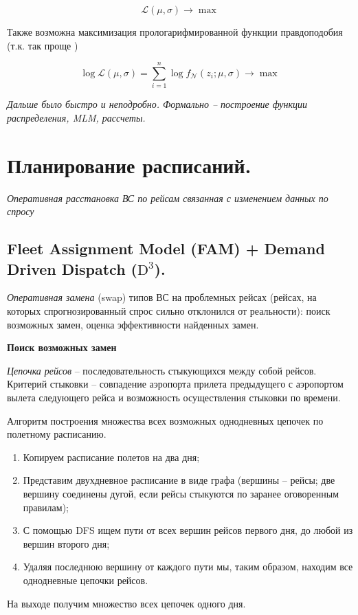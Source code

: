 \documentclass[12pt, reqno]{article}
\theoremstyle{definition}
\theoremstyle{definition}
\theoremstyle{definition}
\theoremstyle{definition}
\theoremstyle{definition}
\theoremstyle{definition}
\theoremstyle{definition}
\theoremstyle{definition}
\theoremstyle{definition}
\begin{document}
		$$\mathcal{L}(\mu, \sigma) \rightarrow \max$$
		
		Также возможна максимизация прологарифмированной функции правдоподобия (т.к. так проще )
		
		$$\log \mathcal{L}(\mu, \sigma) = \sum^n_{i = 1} \log f_\mathcal{N}(z_i; \mu, \sigma) \rightarrow \max$$
		
		\textit{Дальше было быстро и неподробно. Формально -- построение функции распределения, MLM, рассчеты.}
		
		
		
		
		\newpage
		\section{Планирование расписаний.}
		
		\textit{Оперативная расстановка ВС по рейсам связанная с изменением данных по спросу}
		
		\subsection{Fleet Assignment Model (FAM) + Demand Driven Dispatch ($\text{D}^3$).}
		
		
		\textit{Оперативная замена} (swap) типов ВС на проблемных рейсах (рейсах, на которых спрогнозированный спрос сильно отклонился от реальности): поиск возможных замен, оценка эффективности найденных замен.
		
		\textbf{Поиск возможных замен}
		
		\textit{Цепочка рейсов} -- последовательность стыкующихся между собой рейсов. Критерий стыковки -- совпадение аэропорта прилета предыдущего с аэропортом вылета следующего рейса и возможность осуществления стыковки по времени.
		
		Алгоритм построения множества всех возможных однодневных цепочек по полетному расписанию.
		
		\begin{enumerate}
			\item Копируем расписание полетов на два дня;
			\item Представим двухдневное расписание в виде графа (вершины -- рейсы; две вершину соединены дугой, если рейсы стыкуются по заранее оговоренным правилам);
			\item С помощью DFS ищем пути от всех вершин рейсов первого дня, до любой из вершин второго дня;
			\item Удаляя последнюю вершину от каждого пути мы, таким образом, находим все однодневные цепочки рейсов.
		\end{enumerate}
		
		На выходе получим множество всех цепочек одного дня.
		
		
\end{document}

